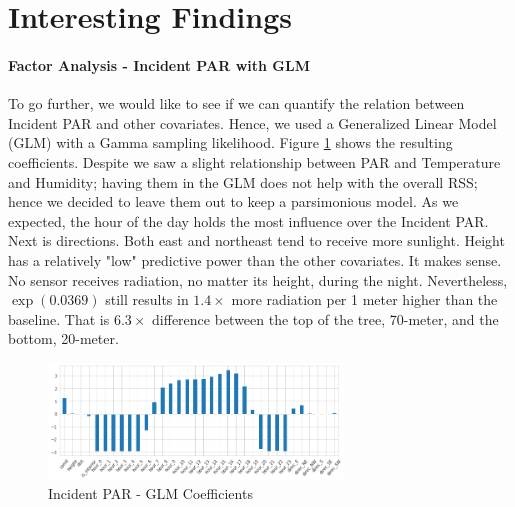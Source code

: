 \documentclass[11pt, letterpaper]{article}
\begin{document}
\section{Interesting Findings}
\paragraph{Factor Analysis - Incident PAR with GLM}
To go further, we would like to see if we can quantify the relation between Incident PAR and other covariates. Hence, we used a Generalized Linear Model (GLM) with a Gamma sampling likelihood. Figure \ref{fig:glm_coef} shows the resulting coefficients. Despite we saw a slight relationship between PAR and Temperature and Humidity; having them in the GLM does not help with the overall RSS; hence we decided to leave them out to keep a parsimonious model. As we expected, the hour of the day holds the most influence over the Incident PAR. Next is directions. Both east and northeast tend to receive more sunlight. Height has a relatively "low" predictive power than the other covariates. It makes sense. No sensor receives radiation, no matter its height, during the night. Nevertheless, $\exp(0.0369)$ still results in $1.4\times$ more radiation per 1 meter higher than the baseline. That is $6.3\times$ difference between the top of the tree, 70-meter, and the bottom, 20-meter.
\begin{figure}[h!]
\centering
\includegraphics[width=0.7\textwidth]{eda_3.5.png}
\captionsetup{justification=centering}
\caption{Incident PAR - GLM Coefficients}
\label{fig:glm_coef}
\end{figure}
\end{document}
